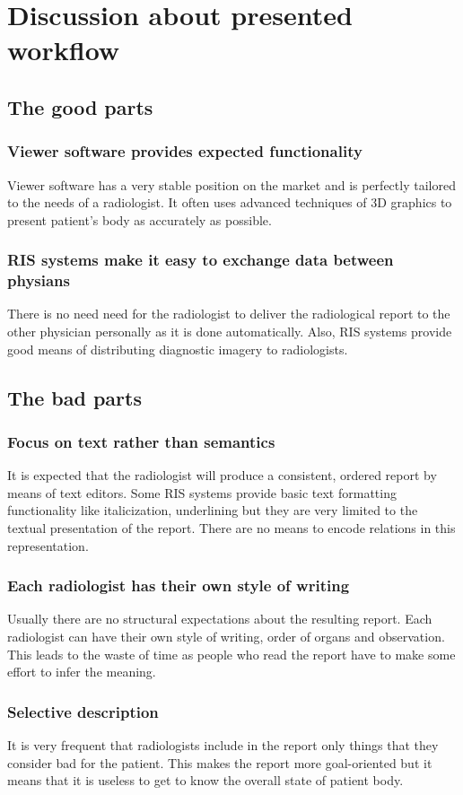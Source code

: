 \documentclass[12pt, twoside, openany]{report}
\theoremstyle{definition}
\begin{document}
\section{Discussion about presented workflow}
\subsection{The good parts}
\subsubsection{Viewer software provides expected functionality}
Viewer software has a very stable position on the market and is perfectly tailored to the needs of a radiologist. It often uses advanced techniques of 3D graphics to present patient's body as accurately as possible.
\subsubsection{RIS systems make it easy to exchange data between physians}
There is no need need for the radiologist to deliver the radiological report to the other physician personally as it is done automatically. Also, RIS systems provide good means of distributing diagnostic imagery to radiologists.
\subsection{The bad parts}
\subsubsection{Focus on text rather than semantics}
It is expected that the radiologist will produce a consistent, ordered report by means of text editors. Some RIS systems provide basic text formatting functionality like italicization, underlining but they are very limited to the textual presentation of the report. There are no means to encode relations in this representation.
\subsubsection{Each radiologist has their own style of writing}
Usually there are no structural expectations about the resulting report. Each radiologist can have their own style of writing, order of organs and observation. This leads to the waste of time as people who read the report have to make some effort to infer the meaning. 
\subsubsection{Selective description}
It is very frequent that radiologists include in the report only things that they consider bad for the patient. This makes the report more goal-oriented but it means that it is useless to get to know the overall state of patient body.
\end{document}
